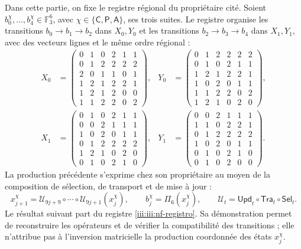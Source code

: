 Dans cette partie, on fixe le registre régional du propriétaire cité.
Soient $b_0^\chi,\ldots,b_4^\chi\in\mathbb F_3^6$, avec
$\chi\in\{\mathsf C,\mathsf P,\mathsf A\}$, ses trois suites.
Le registre organise les transitions $b_0\to b_1\to b_2$ dans
$X_0,Y_0$ et les transitions $b_2\to b_3\to b_4$ dans $X_1,Y_1$,
avec des vecteurs lignes et le même ordre régional :
\begingroup\small
\begin{equation}
\begin{aligned}
X_0&=\begin{pmatrix}
0&1&0&2&1&1\\0&1&2&2&2&2\\2&0&1&1&0&1\\
1&2&1&2&2&1\\1&2&1&2&0&0\\1&1&2&2&0&2
\end{pmatrix},&
Y_0&=\begin{pmatrix}
0&1&2&2&2&2\\0&1&0&2&1&1\\1&2&1&2&2&1\\
1&0&2&0&1&1\\1&1&2&2&0&2\\1&2&1&0&2&0
\end{pmatrix},\\[1ex]
X_1&=\begin{pmatrix}
0&1&0&2&1&1\\0&0&2&1&1&1\\1&0&2&0&1&1\\
0&1&2&2&2&2\\1&2&1&0&2&0\\0&1&0&2&1&0
\end{pmatrix},&
Y_1&=\begin{pmatrix}
0&0&2&1&1&1\\1&1&0&2&2&1\\0&1&2&2&2&2\\
1&0&2&0&1&1\\0&1&0&2&1&0\\0&1&0&2&0&0
\end{pmatrix}.
\end{aligned}
\label{iii:iii:nf-registro}
\end{equation}
\endgroup
La production précédente s’exprime chez son propriétaire au moyen de la
composition de sélection, de transport et de mise à jour :
\[
 x_{j+1}^{\chi}
 =\mathcal U_{9j+9}\circ\cdots\circ\mathcal U_{9j+1}(x_j^{\chi}),
 \qquad b_j^\chi=\Pi_6(x_j^\chi),
 \qquad\mathcal U_t=\mathsf{Upd}_t\circ\mathsf{Tra}_t\circ\mathsf{Sel}_t.
\]
Le résultat suivant part du registre \eqref{iii:iii:nf-registro}.
Sa démonstration permet de reconstruire les opérateurs et de vérifier la
compatibilité des transitions ; elle n’attribue pas à l’inversion matricielle
la production coordonnée des états $x_j^\chi$.

